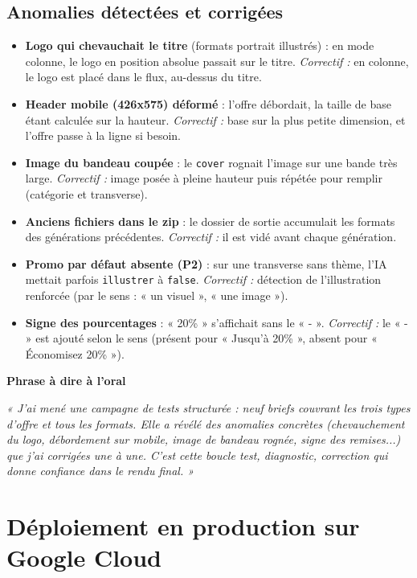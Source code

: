 \documentclass[11pt,a4paper]{article}
\newcommand{\phrasea}[1]{%
  \begin{phrasebox}
  {\bfseries\color{gefblue}\textsf{Phrase à dire à l'oral}}\par\smallskip
  \itshape #1
  \end{phrasebox}%
}
\begin{document}
\subsection{Anomalies détectées et corrigées}
\begin{itemize}[leftmargin=1.4em]
  \item \textbf{Logo qui chevauchait le titre} (formats portrait illustrés) : en mode
        colonne, le logo en position absolue passait sur le titre. \emph{Correctif :}
        en colonne, le logo est placé dans le flux, au-dessus du titre.
  \item \textbf{Header mobile (426x575) déformé} : l'offre débordait, la taille de base
        étant calculée sur la hauteur. \emph{Correctif :} base sur la plus petite
        dimension, et l'offre passe à la ligne si besoin.
  \item \textbf{Image du bandeau coupée} : le \texttt{cover} rognait l'image sur une
        bande très large. \emph{Correctif :} image posée à pleine hauteur puis répétée
        pour remplir (catégorie et transverse).
  \item \textbf{Anciens fichiers dans le zip} : le dossier de sortie accumulait les
        formats des générations précédentes. \emph{Correctif :} il est vidé avant
        chaque génération.
  \item \textbf{Promo par défaut absente (P2)} : sur une transverse sans thème, l'IA
        mettait parfois \texttt{illustrer} à \texttt{false}. \emph{Correctif :}
        détection de l'illustration renforcée (par le sens : « un visuel », « une image »).
  \item \textbf{Signe des pourcentages} : « 20\% » s'affichait sans le « - ».
        \emph{Correctif :} le « - » est ajouté selon le sens (présent pour « Jusqu'à
        20\% », absent pour « Économisez 20\% »).
\end{itemize}

\phrasea{« J'ai mené une campagne de tests structurée : neuf briefs couvrant les trois
types d'offre et tous les formats. Elle a révélé des anomalies concrètes (chevauchement
du logo, débordement sur mobile, image de bandeau rognée, signe des remises...) que j'ai
corrigées une à une. C'est cette boucle test, diagnostic, correction qui donne confiance
dans le rendu final. »}

\section{Déploiement en production sur Google Cloud}
\end{document}
